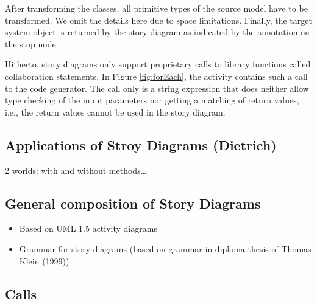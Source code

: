 After transforming the classes, all primitive types of the source model have to be transformed. We omit the details here due to space limitations. 
Finally, the target system object  is returned by the story diagram as indicated by the annotation  on the stop node.

Hitherto, story diagrams only support proprietary calls to library functions called collaboration statements. In Figure \ref{fig:forEach}, the activity  contains such a call to the code generator. The call only is a string expression that does neither allow type checking of the input parameters nor getting a matching of return values, i.e., the return values cannot be used in the story diagram.

\subsection{Applications of Stroy Diagrams (Dietrich)}
2 worlds: with and without methods\ldots

\subsection{General composition of Story Diagrams}
\begin{itemize}
  \item Based on UML 1.5 activity diagrams
  \item Grammar for story diagrams (based on grammar in diploma thesis of Thomas Klein (1999))
\end{itemize}

\subsection{Calls}

